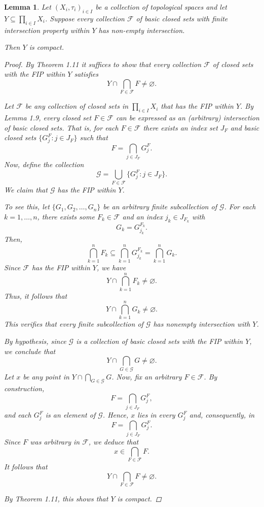 \documentclass[12pt]{article}
\theoremstyle{bigskipthmstyle}
\theoremstyle{thmstyle}
\newtheorem{lemma}[theorem]{Lemma}
\theoremstyle{plainstyle}
\newcommand{\cF}{\mathcal{F}}
\begin{document}
\begin{lemma}\label{lem:bcFIP}
  Let $(X_i,\tau_i)_{i\in I}$ be a collection of topological spaces and let $Y\subseteq\prod_{i\in I} X_i$. Suppose every
  collection $\cF$ of basic closed sets with finite intersection property within $Y$ has non-empty intersection.

  Then $Y$ is compact.

  
\begin{proof}
By Theorem 1.11 it suffices to show that every collection $\mathcal{F}$ of closed sets with the FIP within $Y$ satisfies
\[
Y \cap \bigcap_{F\in\mathcal{F}} F \neq \varnothing.
\]

Let $\mathcal{F}$ be any collection of closed sets in $\prod_{i\in I} X_i$ that has the FIP within $Y$. By Lemma 1.9, every closed set $F\in\mathcal{F}$ can be expressed as an (arbitrary) intersection of basic closed sets. That is, for each $F\in\mathcal{F}$ there exists an index set $J_F$ and basic closed sets $\{G^F_j : j\in J_F\}$ such that
\[
F = \bigcap_{j\in J_F} G^F_j.
\]
Now, define the collection
\[
\mathcal{G} = \bigcup_{F\in\mathcal{F}} \{G^F_j : j\in J_F\}.
\]
We claim that $\mathcal{G}$ has the FIP within $Y$.

To see this, let $\{G_1, G_2, \dots, G_n\}$ be an arbitrary finite subcollection of $\mathcal{G}$. For each $k=1,\dots,n$, there exists some $F_k\in\mathcal{F}$ and an index $j_k\in J_{F_k}$ with 
\[
G_k = G^{F_k}_{j_k}.
\]
Then,
\[
\bigcap_{k=1}^n F_k \subseteq \bigcap_{k=1}^n G^{F_k}_{j_k} = \bigcap_{k=1}^n G_k.
\]
Since $\mathcal{F}$ has the FIP within $Y$, we have
\[
Y\cap \bigcap_{k=1}^n F_k \neq \varnothing.
\]
Thus, it follows that
\[
Y\cap \bigcap_{k=1}^n G_k \neq \varnothing.
\]
This verifies that every finite subcollection of $\mathcal{G}$ has nonempty intersection with $Y$.

By hypothesis, since $\mathcal{G}$ is a collection of basic closed sets with the FIP within $Y$, we conclude that
\[
Y \cap \bigcap_{G\in \mathcal{G}} G \neq \varnothing.
\]
Let $x$ be any point in $Y \cap \bigcap_{G\in \mathcal{G}} G$. Now, fix an arbitrary $F\in \mathcal{F}$. By construction, 
\[
F = \bigcap_{j\in J_F} G^F_j,
\]
and each $G^F_j$ is an element of $\mathcal{G}$. Hence, $x$ lies in every $G^F_j$ and, consequently, in
\[
F = \bigcap_{j\in J_F} G^F_j.
\]
Since $F$ was arbitrary in $\mathcal{F}$, we deduce that
\[
x\in \bigcap_{F\in \mathcal{F}} F.
\]
It follows that
\[
Y\cap \bigcap_{F\in \mathcal{F}} F \neq \varnothing.
\]

By Theorem 1.11, this shows that $Y$ is compact.

\renewcommand\qedsymbol{QED}
\end{proof}


\end{lemma}
\end{document}
